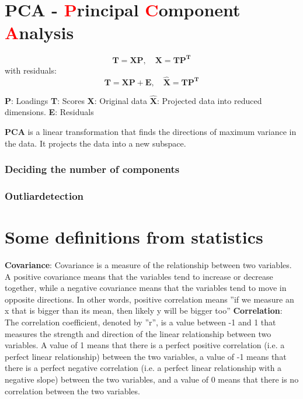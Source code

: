 \section{PCA - \textcolor{red}{P}rincipal \textcolor{red}{C}omponent \textcolor{red}{A}nalysis}
\begin{equation}
\mathbf{
    T = XP, \quad X = TP^T
}
\end{equation}
with residuals:
\begin{equation}
\mathbf{
T = XP + E, \quad \hat{X} = TP^T
}
\end{equation}

\textbf{P}: \quad Loadings \newline
\textbf{T}: \quad Scores \newline
\textbf{X}: \quad Original data \newline
\textbf{$\mathbf{\hat{X}}$}: \quad Projected data into reduced dimensions. \newline
\textbf{E}: \quad Residuals \newline

\textbf{PCA} is a linear transformation that finds the directions of maximum variance in the data. It projects the data into a new subspace.
\newline
\newline

\subsubsection{Deciding the number of components}
\subsubsection{Outliardetection}



\section{Some definitions from statistics}

\textbf{Covariance}: Covariance is a measure of the relationship between two
variables. A positive covariance means that the variables tend to increase
or decrease together, while a negative covariance means that the variables
tend to move in opposite directions. In other words, positive correlation
means ”if we measure an x that is bigger than its mean, then likely y will
be bigger too”\newline \newline
\textbf{Correlation}: The correlation coefficient, denoted by ”r”, is a value between
-1 and 1 that measures the strength and direction of the linear relationship
between two variables. A value of 1 means that there is a perfect positive
correlation (i.e. a perfect linear relationship) between the two variables, a
value of -1 means that there is a perfect negative correlation (i.e. a perfect
linear relationship with a negative slope) between the two variables, and a
value of 0 means that there is no correlation between the two variables.

